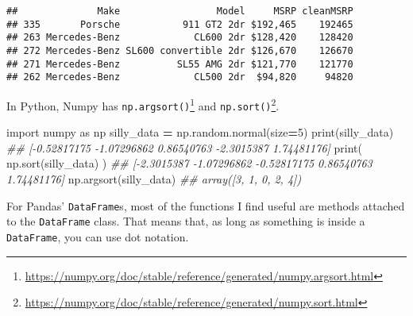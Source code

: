 \documentclass[12pt,krantz2]{krantz}
\makeatletter
\newenvironment{Shaded}{\begin{snugshade}}{\end{snugshade}}
\newcommand{\BuiltInTok}[1]{#1}
\newcommand{\CommentTok}[1]{\textcolor[rgb]{0.37,0.37,0.37}{\textit{#1}}}
\newcommand{\DecValTok}[1]{\textcolor[rgb]{0.06,0.06,0.06}{#1}}
\newcommand{\ImportTok}[1]{#1}
\newcommand{\NormalTok}[1]{#1}
\newcommand{\OperatorTok}[1]{\textcolor[rgb]{0.43,0.43,0.43}{\textbf{#1}}}
\renewcommand{\href}[2]{#2\footnote{\url{#1}}}
\newenvironment{kframe}{%
\medskip{}
\setlength{\fboxsep}{.8em}
 \def\at@end@of@kframe{}%
 \ifinner\ifhmode%
  \def\at@end@of@kframe{\end{minipage}}%
  \begin{minipage}{\columnwidth}%
 \fi\fi%
 \def\FrameCommand##1{\hskip\@totalleftmargin \hskip-\fboxsep
 \colorbox{shadecolor}{##1}\hskip-\fboxsep
     \hskip-\linewidth \hskip-\@totalleftmargin \hskip\columnwidth}%
 \MakeFramed {\advance\hsize-\width
   \@totalleftmargin\z@ \linewidth\hsize
   \@setminipage}}%
 {\par\unskip\endMakeFramed%
 \at@end@of@kframe}
\renewenvironment{Shaded}{\begin{kframe}}{\end{kframe}}
\makeatother
\begin{document}
\begin{verbatim}
##              Make                 Model     MSRP cleanMSRP
## 335       Porsche           911 GT2 2dr $192,465    192465
## 263 Mercedes-Benz             CL600 2dr $128,420    128420
## 272 Mercedes-Benz SL600 convertible 2dr $126,670    126670
## 271 Mercedes-Benz          SL55 AMG 2dr $121,770    121770
## 262 Mercedes-Benz             CL500 2dr  $94,820     94820
\end{verbatim}

In Python, Numpy has \href{https://numpy.org/doc/stable/reference/generated/numpy.argsort.html}{\texttt{np.argsort()}} and \href{https://numpy.org/doc/stable/reference/generated/numpy.sort.html}{\texttt{np.sort()}}.

\begin{Shaded}
\begin{Highlighting}[]
\ImportTok{import}\NormalTok{ numpy }\ImportTok{as}\NormalTok{ np}
\NormalTok{silly_data }\OperatorTok{=}\NormalTok{ np.random.normal(size}\OperatorTok{=}\DecValTok{5}\NormalTok{)}
\BuiltInTok{print}\NormalTok{(silly_data)}
\CommentTok{## [-0.52817175 -1.07296862  0.86540763 -2.3015387   1.74481176]}
\BuiltInTok{print}\NormalTok{( np.sort(silly_data) )}
\CommentTok{## [-2.3015387  -1.07296862 -0.52817175  0.86540763  1.74481176]}
\NormalTok{np.argsort(silly_data)}
\CommentTok{## array([3, 1, 0, 2, 4])}
\end{Highlighting}
\end{Shaded}

For Pandas' \texttt{DataFrame}s, most of the functions I find useful are methods attached to the \texttt{DataFrame} class. That means that, as long as something is inside a \texttt{DataFrame}, you can use dot notation.
\end{document}
